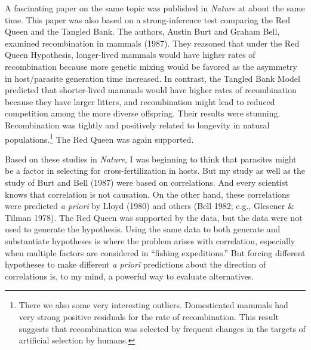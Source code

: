 \documentclass[
  letterpaper,
]{book}
\begin{document}
A fascinating paper on the same topic was published in \emph{Nature} at
about the same time. This paper was also based on a strong-inference
test comparing the Red Queen and the Tangled Bank. The authors, Austin
Burt and Graham Bell, examined recombination in mammals (1987). They
reasoned that under the Red Queen Hypothesis, longer-lived mammals would
have higher rates of recombination because more genetic mixing would be
favored as the asymmetry in host/parasite generation time increased. In
contrast, the Tangled Bank Model predicted that shorter-lived mammals
would have higher rates of recombination because they have larger
litters, and recombination might lead to reduced competition among the
more diverse offspring. Their results were stunning. Recombination was
tightly and positively related to longevity in natural
populations.\footnote{There we also some very interesting outliers.
  Domesticated mammals had very strong positive residuals for the rate
  of recombination. This result suggests that recombination was selected
  by frequent changes in the targets of artificial selection by humans.}
The Red Queen was again supported.

Based on these studies in \emph{Nature}, I was beginning to think that
parasites might be a factor in selecting for cross-fertilization in
hosts. But my study as well as the study of Burt and Bell (1987) were
based on correlations. And every scientist knows that correlation is not
causation. On the other hand, these correlations were predicted \emph{a
priori} by Lloyd (1980) and others (Bell 1982; e.g., Glesener \& Tilman
1978). The Red Queen was supported by the data, but the data were not
used to generate the hypothesis. Using the same data to both generate
and substantiate hypotheses is where the problem arises with
correlation, especially when multiple factors are considered in
``fishing expeditions.'' But forcing different hypotheses to make
different \emph{a priori} predictions about the direction of
correlations is, to my mind, a powerful way to evaluate alternatives.
\end{document}
